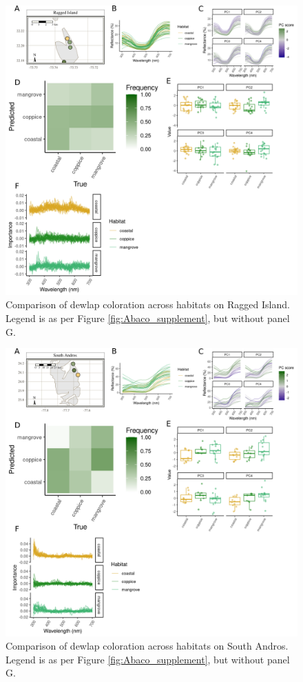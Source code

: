 \pagebreak

\begin{figure}[H]
	\centering
	\includegraphics[width=\textwidth]{figures/RaggedIsland_supplement.png}
	\caption{Comparison of dewlap coloration across habitats on Ragged Island. Legend is as per Figure \ref{fig:Abaco_supplement}, but without panel G.}
	\label{fig:RaggedIsland}
\end{figure}

\pagebreak

\begin{figure}[H]
	\centering
	\includegraphics[width=\textwidth]{figures/SouthAndros_supplement.png}
	\caption{Comparison of dewlap coloration across habitats on South Andros. Legend is as per Figure \ref{fig:Abaco_supplement}, but without panel G.}
	\label{fig:SouthAndros}
\end{figure}

